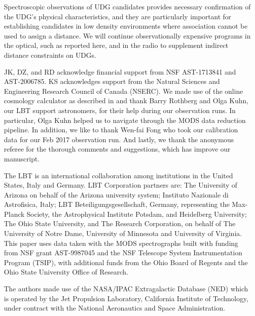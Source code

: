 \documentclass[twocolumn,tighten]{aastex63}
\begin{document}
Spectroscopic observations of UDG candidates provides necessary confirmation of the UDG's physical characteristics, and they are particularly important for establishing candidates in low density environments where association cannot be used to assign a distance. We will continue observationally expensive programs in the optical, such as reported here, and in the radio \citep{karunakaran20} to supplement indirect distance constraints on UDGs. 

\acknowledgments
JK, DZ, and RD acknowledge financial support from NSF AST-1713841 and  AST-2006785. KS acknowledges support from the Natural Sciences and Engineering Research Council of Canada (NSERC).
We made use of the online cosmology calculator as described in \cite{cosmo_calc}
and thank Barry Rothberg and Olga Kuhn, our LBT support astronomers, for their help during our observation runs. In particular, Olga Kuhn helped us to navigate through the MODS data reduction pipeline. In addition, we like to thank Wen-fai Fong who took our calibration data for our Feb 2017 observation run. And lastly, we thank the anonymous referee for the thorough comments and suggestions, which has improve our manuscript.

The LBT is an international collaboration among institutions in the United States, Italy and Germany. LBT Corporation partners are: The University of Arizona on behalf of the Arizona university system; Instituto Nazionale di Astrofisica, Italy; LBT Beteiligungsgesellschaft, Germany, representing the Max-Planck Society, the Astrophysical Institute Potsdam, and Heidelberg University; The Ohio State University, and The Research Corporation, on behalf of The University of Notre Dame, University of Minnesota and University of Virginia.
This paper uses data taken with the MODS spectrographs built with funding from NSF grant AST-9987045 and the NSF Telescope System Instrumentation Program (TSIP), with additional funds from the Ohio Board of Regents and the Ohio State University Office of Research.

The authors made use of the NASA/IPAC Extragalactic Database (NED) which is operated by the Jet Propulsion Laboratory, California Institute of Technology, under contract with the National Aeronautics and Space Administration.


\end{document}

